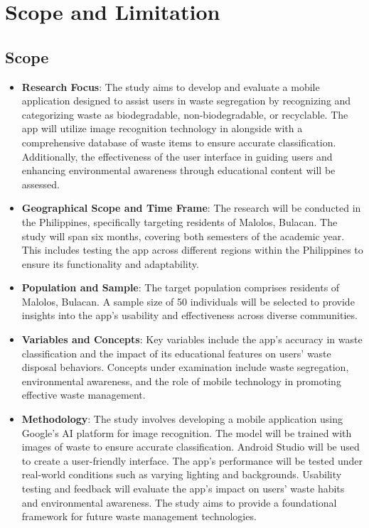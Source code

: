 \section{Scope and Limitation}

	\subsection{Scope}
	\begin{itemize}
		\item \textbf{Research Focus}: The study aims to develop and evaluate a mobile application designed to assist users in waste segregation by recognizing and categorizing waste as biodegradable, non-biodegradable, or recyclable. The app will utilize image recognition technology in alongside with a comprehensive database of waste items to ensure accurate classification. Additionally, the effectiveness of the user interface in guiding users and enhancing environmental awareness through educational content will be assessed.
		
		\item \textbf{Geographical Scope and Time Frame}: The research will be conducted in the Philippines, specifically targeting residents of Malolos, Bulacan. The study will span six months, covering both semesters of the academic year. This includes testing the app across different regions within the Philippines to ensure its functionality and adaptability.
		
		\item \textbf{Population and Sample}: The target population comprises residents of Malolos, Bulacan. A sample size of 50 individuals will be selected to provide insights into the app’s usability and effectiveness across diverse communities.
		
		\item \textbf{Variables and Concepts}: Key variables include the app’s accuracy in waste classification and the impact of its educational features on users' waste disposal behaviors. Concepts under examination include waste segregation, environmental awareness, and the role of mobile technology in promoting effective waste management.
		
		\item \textbf{Methodology}: The study involves developing a mobile application using Google’s AI platform for image recognition. The model will be trained with images of waste to ensure accurate classification. Android Studio will be used to create a user-friendly interface. The app’s performance will be tested under real-world conditions such as varying lighting and backgrounds. Usability testing and feedback will evaluate the app’s impact on users' waste habits and environmental awareness. The study aims to provide a foundational framework for future waste management technologies.
	\end{itemize}
	
